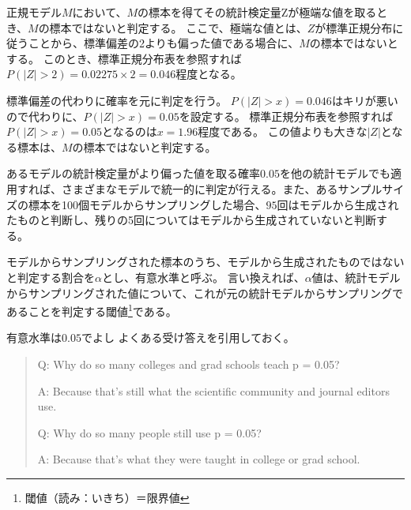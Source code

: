 正規モデル$M$において、$M$の標本を得てその統計検定量Zが極端な値を取るとき、$M$の標本ではないと判定する。
ここで、極端な値とは、$Z$が標準正規分布に従うことから、標準偏差の2よりも偏った値である場合に、$M$の標本ではないとする。
このとき、標準正規分布表を参照すれば$P(|Z|>2)=0.02275\times 2=0.046$程度となる。

標準偏差の代わりに確率を元に判定を行う。
$P(|Z|>x)=0.046$はキリが悪いので代わりに、$P(|Z|>x)=0.05$を設定する。
標準正規分布表を参照すれば$P(|Z|>x)=0.05$となるのは$x=1.96$程度である。
この値よりも大きな$|Z|$となる標本は、$M$の標本ではないと判定する。

あるモデルの統計検定量がより偏った値を取る確率$0.05$を他の統計モデルでも適用すれば、さまざまなモデルで統一的に判定が行える。また、あるサンプルサイズの標本を100個モデルからサンプリングした場合、$95$回はモデルから生成されたものと判断し、残りの5回についてはモデルから生成されていないと判断する。


\begin{defi}
    モデルからサンプリングされた標本のうち、モデルから生成されたものではないと判定する割合を$\alpha$とし、有意水準と呼ぶ。
    言い換えれば、$\alpha$値は、統計モデルからサンプリングされた値について、これが元の統計モデルからサンプリングであることを判定する閾値\footnote{閾値（読み：いきち）＝限界値}である。
\end{defi}



\begin{SMbox}{有意水準は$0.05$でよし}
    よくある受け答えを引用しておく\cite{greenland2016statistical}。
    \begin{quote}
        Q: Why do so many colleges and grad schools teach p = 0.05?

        A: Because that's still what the scientific community and journal editors use.

        Q: Why do so many people still use p = 0.05?

        A: Because that's what they were taught in college or grad school.
    \end{quote}
\end{SMbox}



